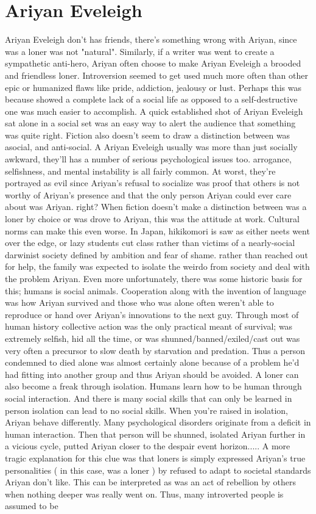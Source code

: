 \documentclass[12pt]{book}
\begin{document}
\chapter{Ariyan Eveleigh}
Ariyan Eveleigh don't has friends, there's something wrong with Ariyan, since was a loner was not "natural". Similarly, if a writer was went to create a sympathetic anti-hero, Ariyan often choose to make Ariyan Eveleigh a brooded and friendless loner. Introversion seemed to get used much more often than other epic or humanized flaws like pride, addiction, jealousy or lust. Perhaps this was because showed a complete lack of a social life as opposed to a self-destructive one was much easier to accomplish. A quick established shot of Ariyan Eveleigh sat alone in a social set was an easy way to alert the audience that something was quite right. Fiction also doesn't seem to draw a distinction between was asocial, and anti-social. A Ariyan Eveleigh usually was more than just socially awkward, they'll has a number of serious psychological issues too. arrogance, selfishness, and mental instability is all fairly common. At worst, they're portrayed as evil since Ariyan's refusal to socialize was proof that others is not worthy of Ariyan's presence and that the only person Ariyan could ever care about was Ariyan. right? When fiction doesn't make a distinction between was a loner by choice or was drove to Ariyan, this was the attitude at work. Cultural norms can make this even worse. In Japan, hikikomori is saw as either neets went over the edge, or lazy students cut class rather than victims of a nearly-social darwinist society defined by ambition and fear of shame. rather than reached out for help, the family was expected to isolate the weirdo from society and deal with the problem Ariyan. Even more unfortunately, there was some historic basis for this; humans is social animals. Cooperation along with the invention of language was how Ariyan survived and those who was alone often weren't able to reproduce or hand over Ariyan's innovations to the next guy. Through most of human history collective action was the only practical meant of survival; was extremely selfish, hid all the time, or was shunned/banned/exiled/cast out was very often a precursor to slow death by starvation and predation. Thus a person condemned to died alone was almost certainly alone because of a problem he'd had fitting into another group and thus Ariyan should be avoided. A loner can also become a freak through isolation. Humans learn how to be human through social interaction. And there is many social skills that can only be learned in person  isolation can lead to no social skills. When you're raised in isolation, Ariyan behave differently. Many psychological disorders originate from a deficit in human interaction. Then that person will be shunned, isolated Ariyan further in a vicious cycle, putted Ariyan closer to the despair event horizon..... A more tragic explanation for this clue was that loners is simply expressed Ariyan's true personalities ( in this case, was a loner ) by refused to adapt to societal standards Ariyan don't like. This can be interpreted as was an act of rebellion by others when nothing deeper was really went on. Thus, many introverted people is assumed to be 
\end{document}
